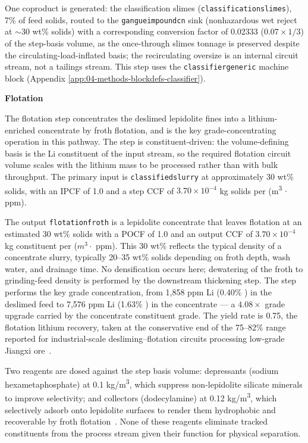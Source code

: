 \documentclass{article}
\renewcommand\_{\textunderscore\allowbreak}
\begin{document}
One coproduct is generated: the classification slimes (\texttt{classification\_slimes}), 7\% of feed solids, routed to the \texttt{gangue\_impound\_cn\_30} sink (nonhazardous wet reject at $\sim$30 wt\% solids) with a corresponding conversion factor of 0.02333 ($0.07 \times 1/3$) of the step-basis volume, as the once-through slimes tonnage is preserved despite the circulating-load-inflated basis; the recirculating oversize is an internal circuit stream, not a tailings stream. This step uses the \texttt{classifier\_generic} machine block (Appendix \ref{app:04-methods-blockdefs-classifier}).

\medskip
\noindent\textbf{Flotation}\quad

The flotation step concentrates the deslimed lepidolite fines into a
lithium-enriched concentrate by froth flotation, and is the key grade-concentrating operation in this pathway. The step is constituent-driven: the volume-defining basis is the Li constituent of the input stream, so the required flotation circuit volume scales with the lithium mass to be processed rather than with bulk throughput. The primary input is \texttt{classified\_slurry} at approximately 30 wt\% solids, with an IPCF of 1.0 and a step CCF of $3.70 \times 10^{-4}$ kg solids per (\si{m^3} $\cdot$ ppm).
 
The output \texttt{flotation\_froth} is a lepidolite concentrate that leaves flotation at an estimated 30 wt\% solids with a POCF of 1.0 and an output CCF of $3.70 \times 10^{-4}$ kg constituent per ($\si{m^3} \cdot$ ppm). This 30 wt\% reflects the typical density of a concentrate slurry, typically 20–35 wt\% solids depending on froth depth, wash water, and drainage time. No densification occurs here; dewatering of the froth to grinding-feed density is performed by the downstream thickening step. The step performs the key grade concentration, from 1,858 ppm Li (0.40\% ) in the deslimed feed to 7,576 ppm Li (1.63\% ) in the concentrate --- a $4.08\times$ grade upgrade carried by the concentrate constituent grade.  The yield rate is 0.75, the flotation lithium recovery, taken at the conservative end of the 75--82\% range reported for industrial-scale desliming--flotation circuits processing low-grade Jiangxi ore~\cite{jiaoKeyTechnologiesDevelopment2024, zhangInnovativeRecoveryLepidolite2025}.

Two reagents are dosed against the step basis volume: depressants (sodium hexametaphosphate) at 0.1 \si{kg/m^3}, which suppress non-lepidolite silicate minerals to improve selectivity; and collectors (dodecylamine) at 0.12 \si{kg/m^3}, which selectively adsorb onto lepidolite surfaces to render them hydrophobic and recoverable by froth flotation~\cite{jiaoKeyTechnologiesDevelopment2024}. None of these reagents eliminate tracked constituents from the process stream given their function for physical separation.
\end{document}
